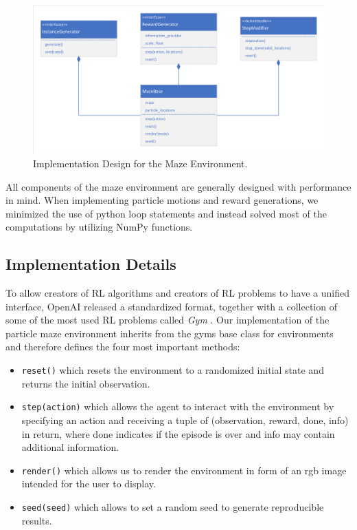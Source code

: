 \begin{figure}[ht]
    
    \begin{center}
        \includegraphics[clip, trim=10px 10px 10px 10px, width=0.9\columnwidth]{figures/implementation/maze_base_design.pdf}
    \end{center}
    
    \caption[Implementation Design for the Maze Environment]{Implementation Design for the Maze Environment.}
    \label{fig:MazeBaseDesign}
  \end{figure}

All components of the maze environment are generally designed with performance in mind. When implementing particle motions and reward generations, we minimized the use of python loop statements and instead solved most of the computations by utilizing NumPy \cite{oliphant2006guide} functions.

\subsection{Implementation Details} \label{sec:MazeImplementationDetails}
To allow creators of RL algorithms and creators of RL problems to have a unified interface, OpenAI released a standardized format, together with a collection of some of the most used RL problems called \textit{Gym} \cite{openAIgym}. Our implementation of the particle maze environment inherits from the gyms base class for environments and therefore defines the four most important methods:

\begin{itemize}
    \item \texttt{reset()} which resets the environment to a randomized initial state and returns the initial observation.
    \item \texttt{step(action)} which allows the agent to interact with the environment by specifying an action and receiving a tuple of (observation, reward, done, info) in return, where done indicates if the episode is over and info may contain additional information.
    \item \texttt{render()} which allows us to render the environment in form of an rgb image intended for the user to display.
    \item \texttt{seed(seed)} which allows to set a random seed to generate reproducible results. 
\end{itemize}

